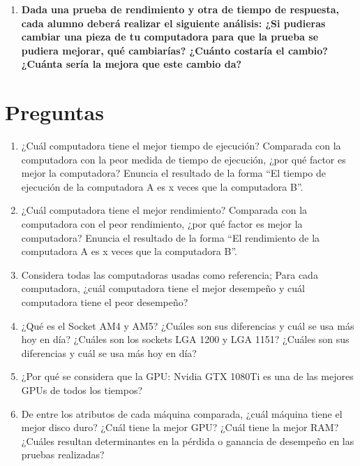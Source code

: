 \documentclass[12pt]{article}
\newcommand{\pl}[1]{\item \textbf{ #1 }}
\begin{document}
\begin{enumerate}[label=(\arabic{section}.\arabic{subsection}.\arabic{enumi})]
    \pl{Dada una prueba de rendimiento y otra de tiempo de respuesta, cada alumno deberá realizar el siguiente análisis: ¿Si pudieras cambiar una pieza de tu computadora para que la prueba se pudiera mejorar, qué cambiarías? ¿Cuánto costaría el cambio? ¿Cuánta sería la mejora que este cambio da?}

\end{enumerate}

\newpage
\section{Preguntas}
\begin{enumerate}[label=(\arabic{section}.\arabic{subsection}.\arabic{enumi})]
    \item ¿Cuál computadora tiene el mejor tiempo de ejecución? Comparada con la computadora con la peor medida de tiempo de ejecución, ¿por qué factor es mejor la computadora? Enuncia el resultado de la forma “El tiempo de ejecución de la computadora A es x veces que la computadora B”.
    
    \item ¿Cuál computadora tiene el mejor rendimiento? Comparada con la computadora con el peor rendimiento, ¿por qué factor es mejor la computadora? Enuncia el resultado de la forma “El rendimiento de la computadora A es x veces que la computadora B”.

    \item Considera todas las computadoras usadas como referencia; Para cada computadora, ¿cuál computadora tiene el mejor desempeño y cuál computadora tiene el peor desempeño?

    \item ¿Qué es el Socket AM4 y AM5? ¿Cuáles son sus diferencias y cuál se usa más hoy en día? ¿Cuáles son los sockets LGA 1200 y LGA 1151? ¿Cuáles son sus diferencias y cuál se usa más hoy en día?

    \item ¿Por qué se considera que la GPU: Nvidia GTX 1080Ti es una de las mejores GPUs de todos los tiempos?

    \item De entre los atributos de cada máquina comparada, ¿cuál máquina tiene el mejor disco duro? ¿Cuál tiene la mejor GPU? ¿Cuál tiene la mejor RAM? ¿Cuáles resultan determinantes en la pérdida o ganancia de desempeño en las pruebas realizadas?
\end{enumerate}
\end{document}
